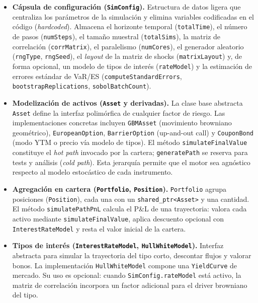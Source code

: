 \documentclass[11pt]{article}
\begin{document}
\begin{itemize}
  \item \textbf{Cápsula de configuración (\texttt{SimConfig}).}
  Estructura de datos ligera que centraliza los parámetros de la simulación y elimina variables codificadas en el código (\emph{hardcoded}).
  Almacena el horizonte temporal (\texttt{totalTime}), el número de pasos (\texttt{numSteps}), el tamaño muestral (\texttt{totalSims}), la matriz de correlación (\texttt{corrMatrix}), el paralelismo (\texttt{numCores}), el generador aleatorio (\texttt{rngType}, \texttt{rngSeed}), el \emph{layout} de la matriz de shocks (\texttt{matrixLayout}) y, de forma opcional, un modelo de tipos de interés (\texttt{rateModel}) y la estimación de errores estándar de VaR/ES (\texttt{computeStandardErrors}, \texttt{bootstrapReplications}, \texttt{sobolBatchCount}).

  \item \textbf{Modelización de activos (\texttt{Asset} y derivadas).}
  La clase base abstracta \texttt{Asset} define la interfaz polimórfica de cualquier factor de riesgo.
  Las implementaciones concretas incluyen \texttt{GBMAsset} (movimiento browniano geométrico), \texttt{EuropeanOption}, \texttt{BarrierOption} (up-and-out call) y \texttt{CouponBond} (modo YTM o precio vía modelo de tipos).
  El método \texttt{simulateFinalValue} constituye el \emph{hot path} invocado por la cartera;  \texttt{generatePath} se reserva para tests y análisis (\emph{cold path}).
  Esta jerarquía permite que el motor sea agnóstico respecto al modelo estocástico de cada instrumento.

  \item \textbf{Agregación en cartera (\texttt{Portfolio}, \texttt{Position}).}
  \texttt{Portfolio} agrupa posiciones (\texttt{Position}), cada una con un \texttt{shared\_ptr<Asset>} y una cantidad.
  El método \texttt{simulatePathPnL} calcula el P\&L de una trayectoria: valora cada activo mediante \texttt{simulateFinalValue}, aplica descuento opcional con \texttt{InterestRateModel} y resta el valor inicial de la cartera.

  \item \textbf{Tipos de interés (\texttt{InterestRateModel}, \texttt{HullWhiteModel}).}
  Interfaz abstracta para simular la trayectoria del tipo corto, descontar flujos y valorar bonos.
  La implementación \texttt{HullWhiteModel} compone una \texttt{YieldCurve} de mercado.
  Su uso es opcional: cuando \texttt{SimConfig.rateModel} está activo, la matriz de correlación incorpora un factor adicional para el driver browniano del tipo.


\end{itemize}
\end{document}
